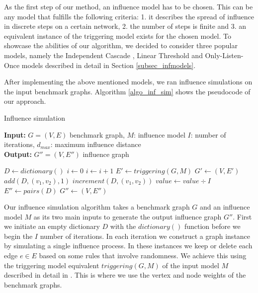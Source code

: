 \documentclass[pdflatex,sn-mathphys-num]{sn-jnl}
\begin{document}
As the first step of our method, an influence model has to be chosen. This can be any model that fulfills the following criteria: 1. it describes the spread of influence in discrete steps on a certain network, 2. the number of steps is finite and 3. an equivalent instance of the triggering model exists \cite{kempe} for the chosen model. To showcase the abilities of our algorithm, we decided to consider three popular models, namely the Independent Cascade \cite{domingos, kempe}, Linear Threshold \cite{granovetter, kempe} and Only-Listen-Once models \cite{kempe} described in detail in Section \ref{subsec_infmodels}.

After implementing the above mentioned models, we ran influence simulations on the input benchmark graphs. Algorithm \ref{algo_inf_sim} shows the pseudocode of our approach.

\begin{algorithm}[ht]
\caption{Influence simulation}
\label{algo_inf_sim}
\textbf{Input:} $G = (V,E)$ benchmark graph, $M$: influence model $I$: number of iterations, $d_{max}$: maximum influence distance
\\
\textbf{Output:} $G'' = (V,E'')$ influence graph
\begin{algorithmic}[1]
    \State $D \gets dictionary()$
    \State $i \gets 0$
        \State $i \gets i + 1$
        \State $E' \gets triggering(G,M)$
        \State $G' \gets (V,E')$
                    \State $add(D,(v_1,v_2),1)$
                \Else
                    \State $increment(D,(v_1,v_2))$
                \EndIf
            \EndIf
        \EndFor
    \EndWhile
        \State $value \gets value \div I$
    \EndFor
    \State $E'' \gets pairs(D)$
    \State $G'' \gets (V,E'')$
\end{algorithmic}
\end{algorithm}

Our influence simulation algorithm takes a benchmark graph $G$ and an influence model $M$ as its two main inputs to generate the output influence graph $G''$. First we initiate an empty dictionary $D$ with the $dictionary()$ function before we begin the $I$ number of iterations. In each iteration we construct a graph instance by simulating a single influence process. In these instances we keep or delete each edge $e \in E$ based on some rules that involve randomness. We achieve this using the triggering model equivalent $triggering(G,M)$ of the input model $M$ described in detail in \cite{kempe}. This is where we use the vertex and node weights of the benchmark graphs.
\end{document}
